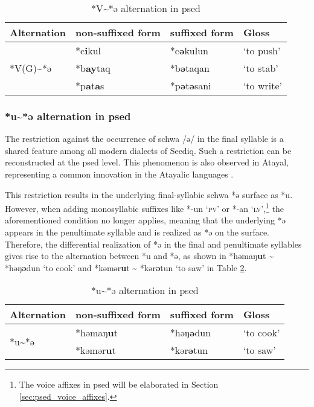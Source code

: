 \begin{table}[!htbp]
\centering
\caption{*V\~{}*ə alternation in \acl{psed}}
\label{tab:psed_V2ə}
\begin{tabular}{llll}
\hline
Alternation                   & non-suffixed form & suffixed form & Gloss     \\ \hline
\multirow{3}{*}{*V(G)\~{ }*ə} & *c\textbf{i}kul & *c\textbf{ə}kulun     & `to push' \\
                              & *b\textbf{ay}taq & *b\textbf{ə}taqan     & `to stab'   \\ 
                              & *p\textbf{a}t\textbf{a}s & *p\textbf{ə}t\textbf{ə}sani & `to write' \\ \hline
\end{tabular}
\end{table}

\subsubsection{*u\~{}*ə alternation in \acl{psed}}

The restriction against the occurrence of schwa /ə/ in the final syllable is a shared feature among all modern dialects of Seediq. Such a restriction can be reconstructed at the \acl{psed} level. This phenomenon is also observed in Atayal, representing a common innovation in the Atayalic languages \parencite{goderich2020phd, li1981paic}. 

This restriction results in the underlying final-syllabic schwa *ə surface as *u. However, when adding monosyllabic suffixes like *-un `\textsc{pv}' or *-an `\textsc{lv}',\footnote{The voice affixes in \acl{psed} will be elaborated in Section \ref{sec:psed_voice_affixes}.} the aforementioned condition no longer applies, meaning that the underlying *ə appears in the penultimate syllable and is realized as *ə on the surface. Therefore, the differential realization of *ə in the final and penultimate syllables gives rise to the alternation between *u and *ə, as shown in *həmaŋ\textbf{u}t \~{} *həŋ\textbf{ə}dun `to cook' and *kəmər\textbf{u}t \~{} *kər\textbf{ə}tun `to saw' in Table \ref{tab:psed_ə2u}.

\begin{table}[!htbp]
\centering
\caption{*u\~{}*ə alternation in \acl{psed}}
\label{tab:psed_ə2u}
\begin{tabular}{llll}
\hline
Alternation               & non-suffixed form    & suffixed form & Gloss     \\ \hline
\multirow{2}{*}{*u\~{ }*ə} & *həmaŋ\textbf{u}t & *həŋ\textbf{ə}dun     & `to cook' \\
                          & *kəmər\textbf{u}t & *kər\textbf{ə}tun     & `to saw'   \\ \hline
\end{tabular}
\end{table}

